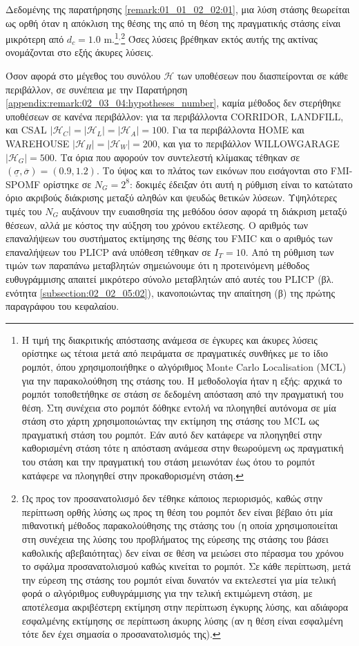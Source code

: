 Δεδομένης της παρατήρησης \ref{remark:01_01_02_02:01}, μια λύση στάσης
θεωρείται ως ορθή όταν η απόκλιση της θέσης της από τη θέση της πραγματικής
στάσης είναι μικρότερη από $d_c = 1.0$ m.\footnote{Η τιμή της διακριτικής
απόστασης ανάμεσα σε έγκυρες και άκυρες λύσεις ορίστηκε ως τέτοια μετά από
πειράματα σε πραγματικές συνθήκες με το ίδιο ρομπότ, όπου χρησιμοποιήθηκε ο
αλγόριθμος Monte Carlo Localisation (MCL) για την παρακολούθηση της στάσης του.
Η μεθοδολογία ήταν η εξής: αρχικά το ρομπότ τοποθετήθηκε σε στάση σε δεδομένη
απόσταση από την πραγματική του θέση. Στη συνέχεια στο ρομπότ δόθηκε εντολή να
πλοηγηθεί αυτόνομα σε μία στάση στο χάρτη χρησιμοποιώντας την εκτίμηση της
στάσης του MCL ως πραγματική στάση του ρομπότ. Εάν αυτό δεν κατάφερε να
πλοηγηθεί στην καθορισμένη στάση τότε η απόσταση ανάμεσα στην θεωρούμενη ως
πραγματική του στάση και την πραγματική του στάση μειωνόταν έως ότου το ρομπότ
κατάφερε να πλοηγηθεί στην προκαθορισμένη στάση.}$^,$\footnote{Ως προς τον
προσανατολισμό δεν τέθηκε κάποιος περιορισμός, καθώς στην περίπτωση ορθής λύσης
ως προς τη θέση του ρομπότ δεν είναι βέβαιο ότι μία πιθανοτική μέθοδος
παρακολούθησης της στάσης του (η οποία χρησιμοποιείται στη συνέχεια της λύσης
του προβλήματος της εύρεσης της στάσης του βάσει καθολικής αβεβαιότητας) δεν
είναι σε θέση να μειώσει στο πέρασμα του χρόνου το σφάλμα προσανατολισμού καθώς
κινείται το ρομπότ. Σε κάθε περίπτωση, μετά την εύρεση της στάσης του ρομπότ
είναι δυνατόν να εκτελεστεί για μία τελική φορά ο αλγόριθμος ευθυγράμμισης για
την τελική εκτιμώμενη στάση, με αποτέλεσμα ακριβέστερη εκτίμηση στην περίπτωση
έγκυρης λύσης, και αδιάφορα εσφαλμένης εκτίμησης σε περίπτωση άκυρης λύσης (αν
η θέση είναι εσφαλμένη τότε δεν έχει σημασία ο προσανατολισμός της).} Όσες
λύσεις βρέθηκαν εκτός αυτής της ακτίνας ονομάζονται στο εξής άκυρες λύσεις.

Όσον αφορά στο μέγεθος του συνόλου $\mathcal{H}$ των υποθέσεων που
διασπείρονται σε κάθε περιβάλλον, σε συνέπεια με την Παρατήρηση
\ref{appendix:remark:02_03_04:hypotheses_number}, καμία μέθοδος δεν στερήθηκε
υποθέσεων σε κανένα περιβάλλον: για τα περιβάλλοντα CORRIDOR, LANDFILL, και
CSAL $|\mathcal{H}_C| = |\mathcal{H}_L| = |\mathcal{H}_A| = 100$. Για τα
περιβάλλοντα HOME και WAREHOUSE $|\mathcal{H}_H| = |\mathcal{H}_W|
= 200$, και για το περιβάλλον WILLOWGARAGE $|\mathcal{H}_G| = 500$.  Τα όρια
που αφορούν τον συντελεστή κλίμακας τέθηκαν σε $(\underline{\sigma},
\overline{\sigma}) = (0.9, 1.2)$. Το ύψος και το πλάτος των εικόνων που
εισάγονται στο FMI-SPOMF ορίστηκε σε $N_G = 2^8$: δοκιμές έδειξαν ότι αυτή η
ρύθμιση είναι το κατώτατο όριο ακριβούς διάκρισης μεταξύ αληθών και ψευδώς
θετικών λύσεων. Υψηλότερες τιμές του $N_G$ αυξάνουν την ευαισθησία της μεθόδου
όσον αφορά τη διάκριση μεταξύ θέσεων, αλλά με κόστος την αύξηση του χρόνου
εκτέλεσης. Ο αριθμός των επαναλήψεων του συστήματος εκτίμησης της θέσης του
FMIC και ο αριθμός των επαναλήψεων του PLICP ανά υπόθεση τέθηκαν σε $I_T = 10$.
Από τη ρύθμιση των τιμών των παραπάνω μεταβλητών σημειώνουμε ότι η προτεινόμενη
μέθοδος ευθυγράμμισης απαιτεί μικρότερο σύνολο μεταβλητών από αυτές του
PLICP (βλ. ενότητα \ref{subsection:02_02_05:02}), ικανοποιώντας την απαίτηση
(β) της πρώτης παραγράφου του κεφαλαίου.

